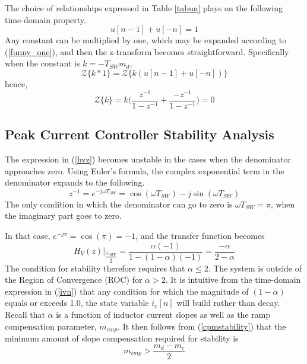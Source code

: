 \documentclass[conference]{IEEEtran}
\begin{document}
The choice of relationships expressed in Table \ref{tabun} plays on the following time-domain property. 
\begin{equation}
u[n-1] + u[-n] = 1 \label{funny_one}
\end{equation}
Any constant can be multiplied by one, which may be expanded according to (\ref{funny_one}), and then the z-transform becomes straightforward. Specifically when the constant is $ k = -T_{SW} m_d $,
\begin{equation}
	\mathcal{Z}\{ k * 1 \} = 
	\mathcal{Z}\{ k (u[n-1] + u[-n]) \}
\end{equation}
hence,
\begin{equation}
\mathcal{Z}\{ k \} = k \bigg( \dfrac{z^{-1}}{1-z^{-1}} + \dfrac{-z^{-1}}{1-z^{-1}} \bigg) = 0
\end{equation}


\subsection{Peak Current Controller Stability Analysis}

The expression in (\ref{hvz}) becomes unstable in the cases when the denominator approaches zero. Using Euler's formula, the complex exponential term in the denominator expands to the following.
\begin{equation}
	z^{-1} = e^{-j \omega T_{SW}} = \cos (\omega T_{SW}) - j \sin (\omega T_{SW}) 
\end{equation} 
The only condition in which the denominator can go to zero is $\omega T_{SW} = \pi$, when the imaginary part goes to zero.

In that case, $e^{-j \pi} = \cos ( \pi) = -1$, and the transfer function becomes
\begin{equation}
H_V(z) |_{\dfrac{\omega_{SW}}{2}} = \dfrac{\alpha (-1)}{1 - (1 - \alpha) (-1)} = \dfrac{- \alpha}{2 - \alpha} \label{cpmstability}
\end{equation}
The condition for stability therefore requires that $\alpha \le 2$.  The system is outside of the Region of Convergence (ROC) for $\alpha > 2$. It is intuitive from the time-domain expression in (\ref{ivn}) that any condition for which the magnitude of $(1 - \alpha)$ equals or exceeds 1.0, the state variable $i_v[n]$ will build rather than decay.
Recall that $\alpha$ is a function of inductor current slopes as well as the ramp compensation parameter, $m_{cmp}$.  It then follows from (\ref{cpmstability}) that the minimum amount of slope compensation required for stability is
\begin{equation}
m_{cmp} > \dfrac{m_d - m_c}{2} \label{slope_stab}
\end{equation}
\end{document}
